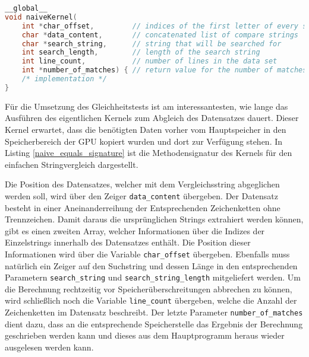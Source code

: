 \newpage

\begin{lstlisting}[language=C++,
caption=Methodensignatur des Kernels,
label=naive_equals_signature]
__global__
void naiveKernel(
	int *char_offset,         // indices of the first letter of every string
	char *data_content,       // concatenated list of compare strings 
	char *search_string,      // string that will be searched for
	int search_length,        // length of the search string
	int line_count,           // number of lines in the data set
	int *number_of_matches) { // return value for the number of matches
	/* implementation */
}
\end{lstlisting}

Für die Umsetzung des Gleichheitstests ist am interessantesten, wie lange das Ausführen des eigentlichen Kernels zum Abgleich des Datensatzes dauert.
Dieser Kernel erwartet, dass die benötigten Daten vorher vom Hauptspeicher in den Speicherbereich der GPU kopiert wurden und dort zur Verfügung stehen.
In Listing \ref{naive_equals_signature} ist die Methodensignatur des Kernels für den einfachen Stringvergleich dargestellt.

Die Position des Datensatzes, welcher mit dem Vergleichsstring abgeglichen werden soll, wird über den Zeiger \texttt{data\_content} übergeben.
Der Datensatz besteht in einer Aneinanderreihung der Entsprechenden Zeichenketten ohne Trennzeichen.
Damit daraus die ursprünglichen Strings extrahiert werden können, gibt es einen zweiten Array, welcher Informationen über die Indizes der Einzelstrings innerhalb des Datensatzes enthält.
Die Position dieser Informationen wird über die Variable \texttt{char\_offset} übergeben.
Ebenfalls muss natürlich ein Zeiger auf den Suchstring und dessen Länge in den entsprechenden Parametern \texttt{search\_string} und \texttt{search\_string\_length} mitgeliefert werden.
Um die Berechnung rechtzeitig vor Speicherüberschreitungen abbrechen zu können, wird schließlich noch die Variable \texttt{line\_count} übergeben, welche die Anzahl der Zeichenketten im Datensatz beschreibt.
Der letzte Parameter \texttt{number\_of\_matches} dient dazu, dass an die entsprechende Speicherstelle das Ergebnis der Berechnung geschrieben werden kann und dieses aus dem Hauptprogramm heraus wieder ausgelesen werden kann.

\newpage

